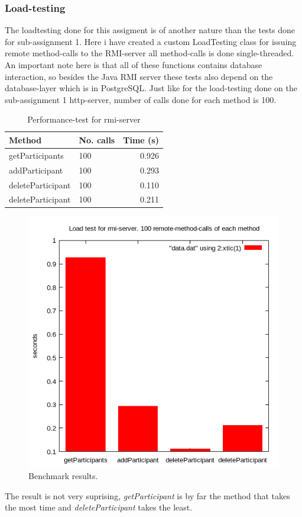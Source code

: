 \documentclass[a4paper, 11pt]{article}
\begin{document}
\subsubsection{Load-testing}
The loadtesting done for this assigment is of another nature than the tests done for sub-assignment 1. Here i have created a custom LoadTesting class for issuing remote method-calls to the RMI-server all method-calls is done single-threaded. An important note here is that all of these functions contains database interaction, so besides the Java RMI server these tests also depend on the database-layer which is in PostgreSQL. Just like for the load-testing done on the sub-assignment 1 http-server, number of calls done for each method is 100.\\
\begin{table}[H]
\centering
\label{Performance test for rmi-server}
\begin{tabular}{|l|l|r|}
\hline
\textbf{Method}  & \textbf{No. calls} & \textbf{Time (s)} \\ \hline
getParticipants	& 100 & 0.926 \\ \hline
addParticipant	& 100 & 0.293 \\ \hline
deleteParticipant & 100 & 0.110 \\ \hline
deleteParticipant & 100 & 0.211 \\ \hline
\end{tabular}
\caption{Performance-test for rmi-server}
\end{table}
\begin{figure}[H]
\includegraphics[scale=0.7]{rmiplot.png}
\caption{Benchmark results.}
\end{figure}
The result is not very suprising, \textit{getParticipant} is by far the method that takes the most  time and \textit{deleteParticipant} takes the least. \\
\end{document}
